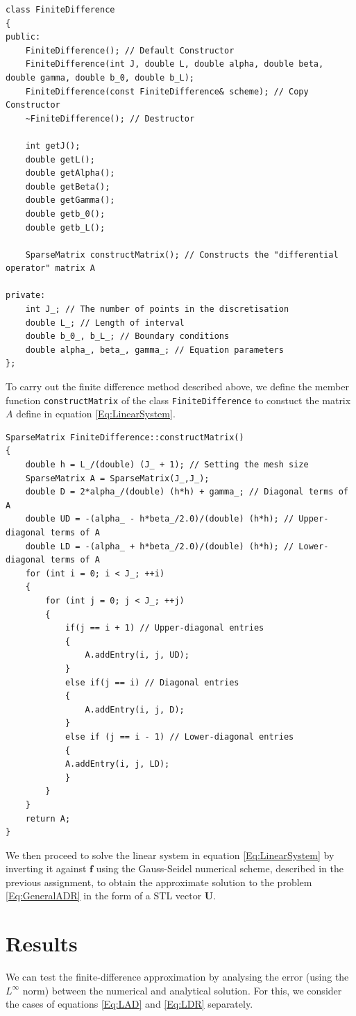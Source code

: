 \documentclass[a4paper,11pt]{article}
\theoremstyle{break}
\theoremstyle{break2}
\theoremstyle{break}
\theoremstyle{break2}
\begin{document}
\begin{lstlisting}
class FiniteDifference
{
public:
	FiniteDifference(); // Default Constructor
	FiniteDifference(int J, double L, double alpha, double beta, double gamma, double b_0, double b_L);
	FiniteDifference(const FiniteDifference& scheme); // Copy Constructor
	~FiniteDifference(); // Destructor

	int getJ();
	double getL();
	double getAlpha();
	double getBeta();
	double getGamma();
	double getb_0();
	double getb_L();

	SparseMatrix constructMatrix(); // Constructs the "differential operator" matrix A

private:
	int J_; // The number of points in the discretisation
	double L_; // Length of interval
	double b_0_, b_L_; // Boundary conditions
	double alpha_, beta_, gamma_; // Equation parameters
};
\end{lstlisting}
To carry out the finite difference method described above, we define the member function \texttt{constructMatrix} of the class \texttt{FiniteDifference} to constuct the matrix $ A $ define in equation \eqref{Eq:LinearSystem}.
\begin{lstlisting}
SparseMatrix FiniteDifference::constructMatrix()
{
	double h = L_/(double) (J_ + 1); // Setting the mesh size
	SparseMatrix A = SparseMatrix(J_,J_);
	double D = 2*alpha_/(double) (h*h) + gamma_; // Diagonal terms of A
	double UD = -(alpha_ - h*beta_/2.0)/(double) (h*h); // Upper-diagonal terms of A
	double LD = -(alpha_ + h*beta_/2.0)/(double) (h*h); // Lower-diagonal terms of A
	for (int i = 0; i < J_; ++i)
	{
		for (int j = 0; j < J_; ++j)
		{
			if(j == i + 1) // Upper-diagonal entries
			{
				A.addEntry(i, j, UD);
			}
			else if(j == i) // Diagonal entries
			{
				A.addEntry(i, j, D);
			}
			else if (j == i - 1) // Lower-diagonal entries
			{
			A.addEntry(i, j, LD);
			}
		}
	}
	return A;
}
\end{lstlisting} 
We then proceed to solve the linear system in equation \eqref{Eq:LinearSystem} by inverting it against $ \mathbf{f} $ using the Gauss-Seidel numerical scheme, described in the previous assignment, to obtain the approximate solution to the problem \eqref{Eq:GeneralADR} in the form of a STL vector $ \mathbf{U} $.
\section{Results}
We can test the finite-difference approximation by analysing the error (using the $ L^{\infty} $ norm) between the numerical and analytical solution. For this, we consider the cases of equations \eqref{Eq:LAD} and \eqref{Eq:LDR} separately.
\end{document}
